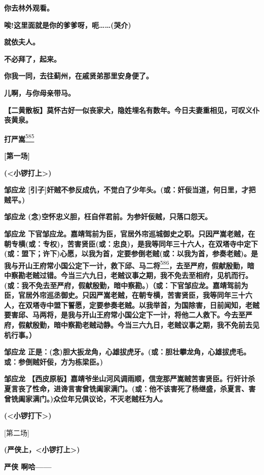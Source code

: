 \textbf{你去林外观看。}

\textbf{唉!这里面就是你的爹爹呀，呃\ldots{}\ldots{}(哭介)}

\textbf{就依夫人。}

\textbf{不必拜了，起来。}

\textbf{你我一同，去往蓟州，在戚贤弟那里安身便了。}

\textbf{儿啊，与你母亲带马。}

\textbf{【二黄散板】莫怀古好一似丧家犬，隐姓埋名有数年。今日夫妻重相见，可叹义仆丧黄泉。}

\textbf{打严嵩}\protect\hyperlink{fn585}{\textsuperscript{585}}

\textbf{{[}第一场{]}}

\textbf{(\textless{}小锣打上\textgreater{})}

\textbf{邹应龙
{[}引子{]}奸贼不参反成仇，不觉白了少年头。(或：奸佞当道，何日里，才把贼平。)}

\textbf{邹应龙 (念)空怀忠义胆，枉自伴君前。为参奸佞贼，只落口怨天。}

\textbf{邹应龙
下官邹应龙。嘉靖驾前为臣，官居外帘巡城御史之职。只因严嵩老贼，在朝专横(或：专权)，苦害贤臣(或：忠良)，是我等同年三十六人，在双塔寺中定下(或：盟下；许下)心愿，以我为首，定要参倒老贼(或：以我为首，参奏老贼)。是我与开山王府常小国公定下一计，救下邱、马二将}\protect\hyperlink{fn586}{\textsuperscript{586}}\textbf{，去至严府，假献殷勤，暗中察勘老贼过错。今当三六九日，老贼议事之期，我不免去至相府，见机而行。(或：我不免去至严府，假献殷勤，暗中察勘。)（或：下官邹应龙。嘉靖驾前为臣，官居外帘巡丞御史。只因严嵩老贼，在朝专横，苦害贤臣，我等同年三十六人，在双塔寺中盟下誓愿，定要参奏老贼。以我举首，为国除害，日前闻知，老贼要害邱、马两将，是我与开山王府常小国公定下一计，将他二人救下。今去至严府，假献殷勤，暗中察勘老贼动静。今当三六九日，老贼议事之期，我不免前去见机行事。）}

\textbf{邹应龙
正是：(念)胆大扳龙角，心雄拔虎牙。(或：胆壮攀龙角，心雄拔虎毛。或：参倒贼奸佞，方为栋梁臣。)}

\textbf{邹应龙
【西皮原板】嘉靖爷坐山河风调雨顺，信宠那严嵩贼苦害贤臣。行奸计杀夏言丧了性命，进谗言害曾铣阖家满门。(或：他不该害死了杨继盛，杀夏言、害曾铣阖家满门。)众位年兄俱议论，不灭老贼枉为人。}

\textbf{(\textless{}小锣打下\textgreater{})}

{[}第二场{]}

\textbf{(严侠上，\textless{}小锣打上\textgreater{})}

\textbf{严侠 啊哈------}

